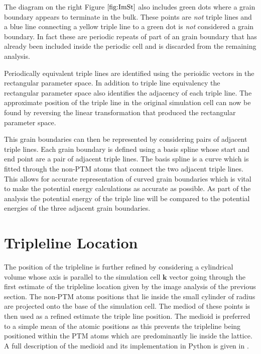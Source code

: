 \documentclass[12pt,a4paper]{book}
\begin{document}
The diagram on the right Figure $\ref{fig:ImSt}$ also includes green dots  where a grain boundary appears to terminate in the bulk. These points are \emph{not} triple lines and a blue line connecting a yellow triple line to a green dot is \emph{not} considered a grain boundary. In fact these are periodic repeats of part of an grain boundary that has already been included inside the periodic cell and is discarded from the remaining analysis.
 
Periodically equivalent triple lines are identified using the perioidic vectors in the rectangular parameter space. In addition to triple line equivalency the rectangular parameter space also identifies the adjacency of each triple line. 
The approximate position of the triple line in the original simulation cell can now be found by reversing the linear transformation that produced the rectangular parameter space.

This grain boundaries can then be represented by considering pairs of adjacent triple lines. Each grain boundary is defined using a basis spline whose start and end point are a pair of adjacent triple lines. The basis spline is a curve which is fitted through the non-PTM atoms that connect the two adjacent triple lines. This allows for accurate representation of curved grain boundaries which is vital to make the potential energy calculations as accurate as possible. As part of the analysis the potential energy of the triple line will be compared to the potential energies of the three adjacent grain boundaries.  


\section{Tripleline Location} \label{sec:TJLocation}

The position of the tripleline is further refined by considering a cylindrical volume whose axis is parallel to the simulation cell $\mathbf{k}$ vector going through the first estimate of the tripleline location given by the image analysis of the previous section. The non-PTM atoms positions that lie inside the small cylinder of radius are projected onto the base of the simulation cell. The mediod of these points is then used as a refined estimate the triple line position. The medioid is preferred to a simple mean of the atomic positions as this prevents the tripleline being positioned within the PTM atoms which are predominantly lie inside the lattice. A full description of the medioid and its implementation in Python is given in \cite{Bauckhage2015}. 
\end{document}
